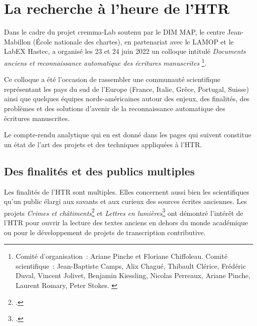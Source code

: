 \documentclass[a4paper,12pt,twoside]{book}
\begin{document}
		\section{La recherche à l'heure de l'HTR}
		
			Dans le cadre du projet \gls{cremma}-Lab soutenu par le DIM MAP, le centre
			Jean-Mabillon (École nationale des chartes), en partenariat avec le
			LAMOP et le LabEX Hastec, a organisé les 23 et 24 juin 2022 un colloque
			intitulé \textit{Documents anciens et reconnaissance automatique des écritures manuscrites}
			\footnote{Comité d'organisation~: Ariane Pinche et Floriane Chiffoleau. Comité scientifique~: Jean-Baptiste Camps, Alix Chagué, Thibault Clérice, Frédéric Duval, Vincent Jolivet, Benjamin Kiessling, Nicolas Perreaux, Ariane Pinche, Laurent Romary, Peter Stokes. \cite{DocumentsAnciensReconnaissance}}.
			
			Ce colloque a été l'occasion de rassembler une communauté scientifique
			représentant les pays du sud de l'Europe (France, Italie, Grêce,
			Portugal, Suisse) ainsi que quelques équipes nords-américaines autour
			des enjeux, des finalités, des problèmes et des solutions d'avenir de la
			reconnaissance automatique des écritures manuscrites.
			
			Le compte-rendu analytique qui en est donné dans les pages qui suivent constitue un état de l'art des projets et des techniques appliquées à l'HTR.
			
			\subsection{Des finalités et des publics multiples}
		
				Les finalités de l'HTR sont multiples. Elles concernent aussi bien les
				scientifiques qu'un public élargi aux savants et aux curieux des sources
				écrites anciennes. Les projets \textit{Crimes et châtiments}\footcite{paupeCursiveXVIIeSiecle2022} et
				\textit{Lettres en lumières}\footcite{fizaineLettresLumieres2022a} ont démontré l'intérêt de l'HTR pour
				ouvrir la lecture des textes anciens en dehors du monde académique ou
				pour le développement de projets de transcription contributive.
				
\end{document}
